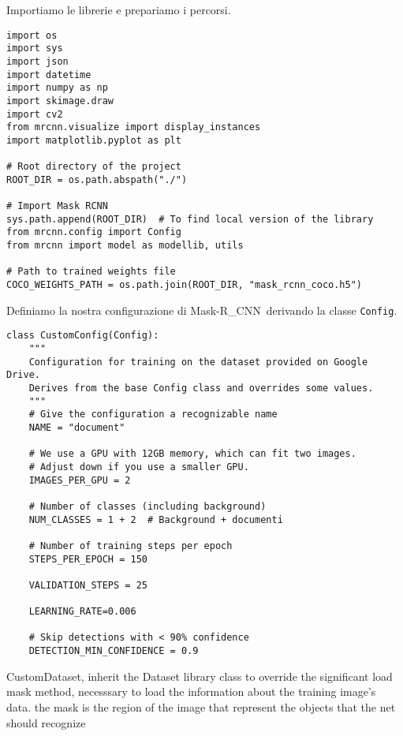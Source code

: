 \documentclass[12pt,a4paper]{article}
\newcommand{\mrcnn}{Mask-R\_CNN}
\begin{document}
Importiamo le librerie e prepariamo i percorsi.

\begin{verbatim}
import os
import sys
import json
import datetime
import numpy as np
import skimage.draw
import cv2
from mrcnn.visualize import display_instances
import matplotlib.pyplot as plt

# Root directory of the project
ROOT_DIR = os.path.abspath("./")

# Import Mask RCNN
sys.path.append(ROOT_DIR)  # To find local version of the library
from mrcnn.config import Config
from mrcnn import model as modellib, utils

# Path to trained weights file
COCO_WEIGHTS_PATH = os.path.join(ROOT_DIR, "mask_rcnn_coco.h5")
\end{verbatim}

Definiamo la nostra configurazione di \mrcnn\ derivando la classe
\texttt{Config}.

\begin{verbatim}
class CustomConfig(Config):
    """
    Configuration for training on the dataset provided on Google Drive.
    Derives from the base Config class and overrides some values.
    """
    # Give the configuration a recognizable name
    NAME = "document"

    # We use a GPU with 12GB memory, which can fit two images.
    # Adjust down if you use a smaller GPU.
    IMAGES_PER_GPU = 2

    # Number of classes (including background)
    NUM_CLASSES = 1 + 2  # Background + documenti

    # Number of training steps per epoch
    STEPS_PER_EPOCH = 150

    VALIDATION_STEPS = 25

    LEARNING_RATE=0.006

    # Skip detections with < 90% confidence
    DETECTION_MIN_CONFIDENCE = 0.9
\end{verbatim}

CustomDataset, inherit the Dataset library class to override the
significant load mask method, necesssary to load the information about
the training image's data. the mask is the region of the image that
represent the objects that the net should recognize
\end{document}
